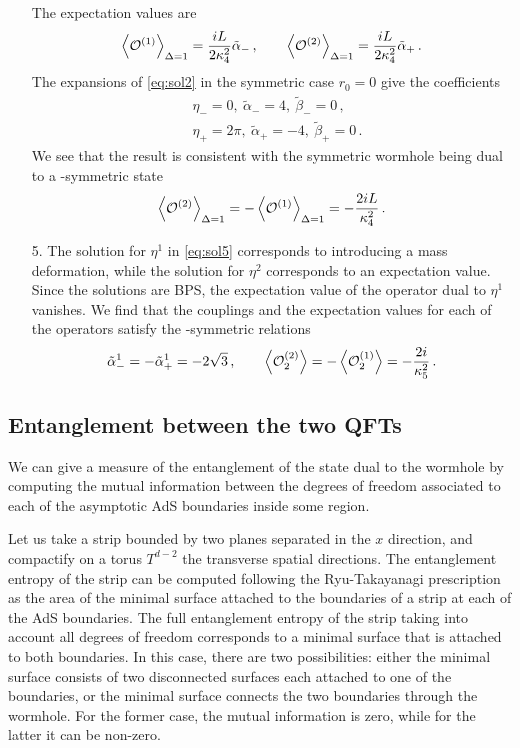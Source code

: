 \begin{enumerate}
The expectation values are
\begin{equation}\label{eq:vevaltquant}
	\vev{\cO^{(1)}}_{\Delta=1}=\frac{i L}{2\kappa_4^2 } \tilde\alpha_-
	\,,\qquad
	\vev{\cO^{(2)}}_{\Delta=1}=\frac{iL}{2\kappa_4^2} \tilde\alpha_+\,.
\end{equation}
The expansions of \cref{eq:sol2} in the symmetric case $r_0=0$ give the coefficients
\begin{equation}
\begin{split}
   & \eta_-=0,\ \tilde\alpha_-=4,\ \tilde\beta_-=0\,,\\
   & \eta_+=2\pi,\ \tilde\alpha_+=-4,\ \tilde\beta_+=0\,.
\end{split}
\end{equation}
We see that the result is consistent with the symmetric wormhole being dual to a \PT-symmetric state
\begin{equation}
	\vev{\cO^{(2)}}_{\Delta=1}=-\vev{\cO^{(1)}}_{\Delta=1}=-\frac{2iL}{\kappa_4^2}\,.
\end{equation}

\item[5.] The solution for $\eta^1$ in \cref{eq:sol5} corresponds to introducing a mass deformation, while the solution for $\eta^2$ corresponds to an expectation value.
Since the solutions are BPS, the expectation value of the operator dual to $\eta^1$ vanishes.
We find that the couplings and the expectation values for each of the operators satisfy the \PT-symmetric relations
\begin{equation}
	\tilde\alpha_-^1=-\tilde\alpha_+^1=-2\sqrt{3}
	\,,\qquad
	\left\langle{\mathcal{O}_2^{(2)}}\right\rangle=-\left\langle{\mathcal{O}_2^{(1)}}\right\rangle=-\frac{2i}{\kappa^2_{5}}\,.
\end{equation}

\end{enumerate}

\subsection{Entanglement between the two QFTs}

We can give a measure of the entanglement of the state dual to the wormhole by computing the mutual information between the degrees of freedom associated to each of the asymptotic AdS boundaries inside some region. 

Let us take a strip bounded by two planes separated in the $x$ direction, and compactify on a torus $T^{d-2}$ the transverse spatial directions.
The entanglement entropy of the strip can be computed following the Ryu-Takayanagi prescription as the area of the minimal surface attached to the boundaries of a strip at each of the AdS boundaries.
The full entanglement entropy of the strip taking into account all degrees of freedom corresponds to a minimal surface that is attached to both boundaries.
In this case, there are two possibilities: either the minimal surface consists of two disconnected surfaces each attached to one of the boundaries, or the minimal surface connects the two boundaries through the wormhole.
For the former case, the mutual information is zero, while for the latter it can be non-zero.

